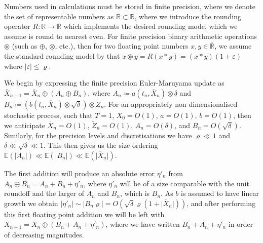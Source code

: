 \documentclass[9pt,a4paper,english]{extarticle}
\begin{document}
Numbers used in calculations must be stored in finite precision, where we denote the set of representable numbers as $ \overline{\mathbb{R}} \subset \mathbb{R}$, where we introduce the rounding operator $ R \colon \mathbb{R} \to \overline{\mathbb{R}}$ which implements the desired rounding mode, which we assume is round to nearest even. For finite precision binary arithmetic operations $ \circledast $ (such as $\oplus$, $\otimes$, etc.), then for two floating point numbers $ x,y \in \overline{\mathbb{R}} $, we assume the standard rounding model by \citet[2.2, (2.4)]{higham2002accuracy} \citep[page~99, (13.7)]{trefethen1997numerical} that $ x \circledast y = R(x\ast y) = (x \ast y ) (1 + \varepsilon)$ where $ \lvert \varepsilon\rvert \leq \varrho $. 

We begin by expressing the finite precision Euler-Maruyama update as  
$ \overline{X}_{n+1} = \overline{X}_n \oplus (A_n \oplus B_n ) $, where $ A_n \coloneqq 
a(t_n, \overline{X}_n) \otimes \delta $ and $ B_n \coloneqq  (b(t_n, \overline{X}_n) \otimes \sqrt{\delta}) \otimes \widetilde{Z}_n $. For an appropriately non dimensionalised stochastic process, such that $ T = 1 $, $ X_0 = O(1) $, $ a = O(1) $, $ b = O(1) $, then we anticipate $ \overline{X}_n = O(1) $, $ \widetilde{Z}_n = O(1) $, $ A_n = O(\delta) $, and $ B_n = O(\sqrt{\delta}) $. Similarly, for the precision levels and discretisations we have $ \varrho \ll 1 $ and $ \delta \ll \sqrt{\delta} \ll 1 $. This then gives us the size ordering $ \mathbb{E}(\lvert A_n \rvert) \ll \mathbb{E}(\lvert B_n \rvert) \ll \mathbb{E}(\lvert \overline{X}_n \rvert)$.

The first addition will produce an absolute error $ \eta'_n $ from $ A_n \oplus B_n = A_n + B_n + \eta'_n  $, where $ \eta'_n $ will be of  a size comparable with the unit roundoff and the larger of $ A_n $ and $ B_n $, which is $ B_n $. As $ b $ is assumed to have linear growth we obtain $ \lvert \eta'_n\rvert  \sim \lvert B_n \varrho\rvert  = O(\sqrt{\delta} \varrho (1 + \lvert\overline{X}_n\rvert))$, and after performing this first floating point addition we will be left with
$ \overline{X}_{n+1} = \overline{X}_n \oplus (B_n + A_n + \eta'_n ) $,
where we have written $ B_n + A_n + \eta'_n $ in order of decreasing magnitudes. 
\end{document}
